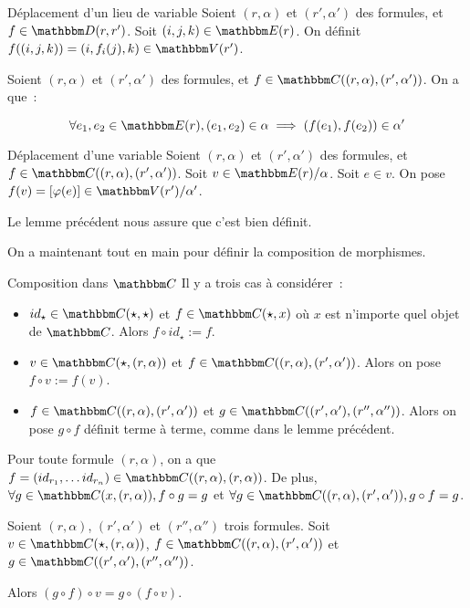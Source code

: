 \begin{defi}{Déplacement d'un lieu de variable}
    Soient $(r,\alpha)$ et $(r',\alpha')$ des formules, et $f\in\D(r,r')$.
    Soit $(i,j,k)\in\E(r)$. On définit $f((i,j,k)) = (i, f_i(j), k)\in\V(r')$.
\end{defi}

\begin{lem}
    Soient $(r,\alpha)$ et $(r',\alpha')$ des formules, et
    $f\in\C((r,\alpha),(r',\alpha'))$.
    On a que~:
    
    \[\forall e_1,e_2\in\E(r), (e_1,e_2)\in\alpha\implies (f(e_1),f(e_2))\in \alpha'\]
\end{lem}

\begin{defi}{Déplacement d'une variable}
    Soient $(r,\alpha)$ et $(r',\alpha')$ des formules, et
    $f\in\C((r,\alpha),(r',\alpha'))$.
    Soit $v\in\E(r)/\alpha$. Soit $e\in v$. On pose $f(v) = [\phi(e)]\in\V(r')/\alpha'$.

    Le lemme précédent nous assure que c'est bien définit.
\end{defi}

On a maintenant tout en main pour définir la composition de morphismes.

\begin{defi}{Composition dans $\C$}
    Il y a trois cas à considérer~:\begin{itemize}
        \item $id_\star\in\C(\star,\star)$ et $f\in\C(\star, x)$ où $x$ est n'importe
            quel objet de $\C$. Alors $f\circ id_\star := f$.
        \item $v\in\C(\star, (r,\alpha))$ et $f\in\C((r,\alpha), (r',\alpha'))$. Alors
            on pose $f\circ v := f(v)$.
        \item $f\in\C((r,\alpha),(r',\alpha'))$ et $g\in\C((r',\alpha'),(r'',\alpha''))$.
            Alors on pose $g\circ f$ définit terme à terme, comme dans le lemme
            précédent.
    \end{itemize}
\end{defi}

\begin{lem}
    Pour toute formule $(r,\alpha)$, on a que
        $f=(id_{r_1},\dots id_{r_n})\in\C((r,\alpha),(r,\alpha))$.
    De plus, $\forall g\in\C(x, (r,\alpha)), f\circ g = g$
    et $\forall g\in\C((r,\alpha), (r',\alpha')), g\circ f = g$.
\end{lem}

\begin{lem}
    Soient $(r,\alpha)$, $(r',\alpha')$ et $(r'',\alpha'')$ trois formules.
    Soit $v\in\C(\star,(r,\alpha))$,
    $f\in\C((r,\alpha), (r',\alpha'))$ et $g\in\C((r',\alpha'), (r'',\alpha''))$.

    Alors $(g\circ f)\circ v = g\circ (f\circ v)$.
\end{lem}

